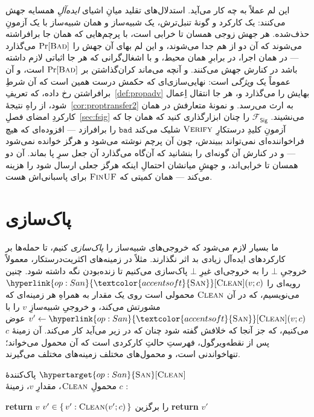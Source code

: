 \documentclass[10pt,oneside,openany]{book}
\newcommand{\op}[1]{\textnormal{\textsc{#1}}}
\newcommand{\opdef}[1]{\hypertarget{op:#1}{\op{#1}}}
\newcommand{\opl}[1]{\hyperlink{op:#1}{\textcolor{accentsoft}{\op{#1}}}}
\newcommand{\Bad}{\op{Bad}}
\newcommand{\Fsig}{\mathcal{F}_{\mathsf{Sig}}}
\newcommand{\none}{\bot}
\newcommand{\San}{\opl{San}}
\newcommand{\Clean}{\op{Clean}}
\newcommand{\V}[1]{\mathtt{#1}}
\newcommand{\params}[1]{{\footnotesize\normalfont\color{black!72} #1}}
\newcommand{\opsig}[1]{\textcolor{accent}{\underline{\smash{#1}}}}
\theoremstyle{accentdef}
\theoremstyle{accentplain}
\begin{document}
این لم عملاً به چه کار می‌آید. استدلال‌های تقلید میانِ اشیای \emph{ایده‌آلِ}
همسایه جهش می‌کنند: یک کارکرد و گونهٔ تنبل‌ترش، یک شبیه‌ساز و همان شبیه‌ساز
با یک آزمونِ حذف‌شده. هر جهش زوجی همسان تا خرابی است، با پرچم‌هایی که همان
جا برافراشته می‌شوند که آن دو از هم جدا می‌شوند، و این لم بهای آن جهش را
$\Pr[\Bad]$ می‌گذارد --- در همان اجرا، در برابرِ همان محیط، و با
اشغال‌گرانی که هر جا اثباتی لازم داشته باشد در کنارش جهش می‌کنند. و آنچه
می‌ماند کران‌گذاشتن بر $\Pr[\Bad]$ است، و آن عموماً یک \emph{ویژگی} است:
نهایی‌سازی‌ای که حکمش درست همین است که آن شرطِ برافراشتن رخ داده، که
تعریفِ~\ref{def:propadv} بهایش را می‌گذارد و، هر جا انتقال اِعمال شود، از
راهِ نتیجهٔ~\ref{cor:proptransfer2} به ارث می‌رسد. و نمونهٔ متعارفش در همان
کارکردِ امضای فصلِ~\ref{sec:fsig} می‌نشیند. $\Fsig$ را چنان ابزارگذاری
کنید که همان جا که آزمونِ کلیدِ درستکارِ $\op{Verify}$ شلیک می‌کند $\V{bad}$
را برافرازد --- افزوده‌ای که هیچ فراخواننده‌ای نمی‌تواند ببیندش، چون آن پرچم
نوشته می‌شود و هرگز خوانده نمی‌شود --- و در کنارش آن گونه‌ای را بنشانید که
آن‌گاه می‌گذارد آن جعل سرِ پا بماند. آن دو همسان تا خرابی‌اند، و جهشِ میانشان
احتمالِ اینکه هرگز جعلی ارسال شود را هزینه می‌کند --- همان کمیتی که
$\op{FinUF}$ برای پاسبانی‌اش هست.

\chapter{پاک‌سازی}\label{sec:sanitization}

ما بسیار لازم می‌شود که خروجی‌های شبیه‌ساز را \emph{پاک‌سازی} کنیم، تا
حمله‌ها بر کارکردهای ایده‌آل زیادی بد اثر نگذارند. مثلاً در زمینه‌های
اکثریت‌درستکار، معمولاً خروجیِ $\none$ را به خروجی‌ای غیرِ $\none$ پاک‌سازی
می‌کنیم تا زنده‌بودن نگه داشته شود. چنین رویه‌ای را $\San[\Clean](v; c)$
می‌نویسیم، که در آن $\Clean$ محمولی است روی یک مقدار به همراهِ هر زمینه‌ای که
مشورتش می‌کند، و خروجیِ شبیه‌سازِ $v$ را با $v' \gets \San[\Clean](v; c)$ عوض
می‌کنیم، که جز آنجا که خلافش گفته شود چنان که در زیر می‌آید کار می‌کند. آن
زمینهٔ $c$ پس از نقطه‌ویرگول، فهرستِ حالتِ کارکردی است که آن محمول می‌خواند؛
تنها‌خواندنی است، و محمول‌های مختلف زمینه‌های مختلف می‌گیرند.

\begin{procedure}{پاک‌کنندهٔ $\opdef{San}[\Clean]$ \\
\params{محمولِ $\Clean$، \quad مقدارِ $v$، \quad زمینهٔ $c$}}
\opsig{$\San[\Clean](v; c)$}:
\begin{algorithmic}[1]
\If{$\Clean(v; c)$}
  \State \textbf{return} $v$
\EndIf
\State $v' \in \{\, v' : \Clean(v'; c) \,\}$ را برگزین \label{ln:sanpick}
\State \textbf{return} $v'$
\end{algorithmic}
\end{procedure}
\end{document}

